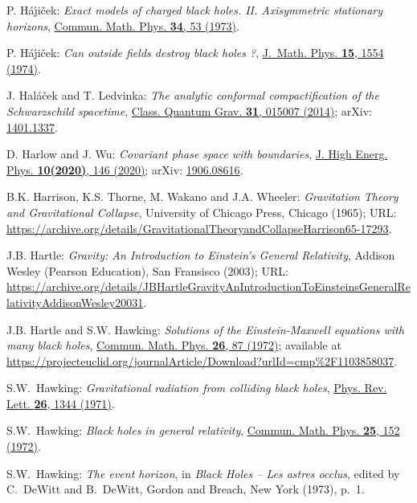 \begin{thebibliography}{123}
P. H\'a\'\j i\v{c}ek:
{\em Exact models of charged black holes.
II. Axisymmetric stationary horizons},
\href{https://doi.org/10.1007/BF01646542}{Commun. Math. Phys. {\bf 34}, 53 (1973)}.

P. H\'a\'\j i\v{c}ek:
{\em Can outside fields destroy black holes ?},
\href{https://doi.org/10.1063/1.1666846}{J.~Math. Phys. {\bf 15}, 1554 (1974)}.

J. Hal\'a\v{c}ek and T. Ledvinka:
{\em The analytic conformal compactification of the Schwarzschild spacetime},
\href{https://doi.org/10.1088/0264-9381/31/1/015007}{Class. Quantum Grav. {\bf 31}, 015007 (2014)};
arXiv: \href{https://arxiv.org/abs/1401.1337}{1401.1337}.

D. Harlow and J. Wu:
{\em Covariant phase space with boundaries},
\href{https://doi.org/10.1007/JHEP10(2020)146}{J. High Energ. Phys. {\bf 10(2020)}, 146 (2020)};
arXiv: \href{https://arxiv.org/abs/1906.08616}{1906.08616}.

B.K. Harrison, K.S. Thorne, M. Wakano and J.A. Wheeler:
{\em Gravitation Theory and Gravitational Collapse},
University of Chicago Press, Chicago (1965);
URL: {\footnotesize\url{https://archive.org/details/GravitationalTheoryandCollapseHarrison65-17293}}.

J.B. Hartle: \emph{Gravity: An Introduction to Einstein's General Relativity},
Addison Wesley (Pearson Education), San Fransisco (2003);
URL: {\footnotesize\url{https://archive.org/details/JBHartleGravityAnIntroductionToEinsteinsGeneralRelativityAddisonWesley20031}}.

J.B. Hartle and S.W. Hawking:
{\em Solutions of the Einstein-Maxwell equations with many black holes},
\href{https://doi.org/10.1007/BF01645696}{Commun. Math. Phys. {\bf 26}, 87 (1972)};
available at {\footnotesize\url{https://projecteuclid.org/journalArticle/Download?urlId=cmp%2F1103858037}}.

S.W.~Hawking:
{\em Gravitational radiation from colliding black holes},
\href{https://doi.org/10.1103/PhysRevLett.26.1344}{Phys. Rev. Lett. {\bf 26}, 1344 (1971)}.

S.W.~Hawking:
{\em Black holes in general relativity},
\href{https://doi.org/10.1007/BF01877517}{Commun. Math. Phys. {\bf 25}, 152 (1972)}.

S.W.~Hawking:
{\em The event horizon},
in {\em Black Holes -- Les astres occlus}, edited by C.~DeWitt and B.~DeWitt,
Gordon and Breach, New York (1973), p.~1.


\end{thebibliography}
